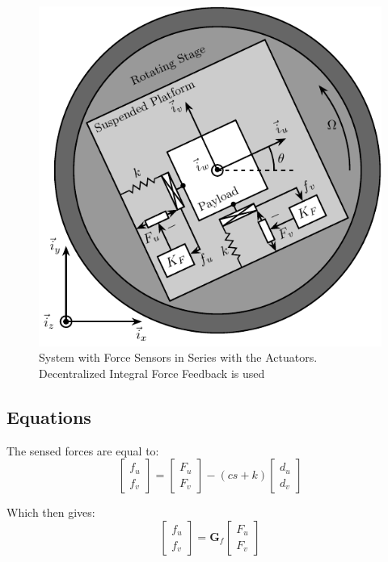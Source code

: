 \documentclass{ISMA_USD2020}
\begin{document}
\begin{figure}[htbp]
\centering
\includegraphics[scale=1]{figs/system_iff.pdf}
\caption{\label{fig:system_iff}System with Force Sensors in Series with the Actuators. Decentralized Integral Force Feedback is used}
\end{figure}

\subsection{Equations}
\label{sec:org4072ea4}
The sensed forces are equal to:
\begin{equation}
\begin{bmatrix} f_{u} \\ f_{v} \end{bmatrix} =
\begin{bmatrix} F_u \\ F_v \end{bmatrix} - (c s + k)
\begin{bmatrix} d_u \\ d_v \end{bmatrix}
\end{equation}

Which then gives:
\begin{equation}
\begin{bmatrix} f_{u} \\ f_{v} \end{bmatrix} =
\bm{G}_{f}
\begin{bmatrix} F_u \\ F_v \end{bmatrix}
\end{equation}
\end{document}

